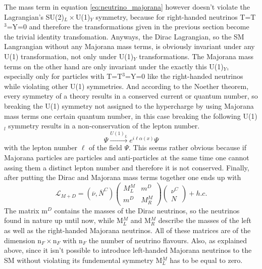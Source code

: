 The mass term in equation \ref{eq:neutrino_majorana} however doesn't violate the Lagrangian's SU(2)$_L\times$U(1)$_Y$ symmetry, because for right-handed neutrinos T=T$^3$=Y=0 and therefore the transformations given in the previous section become the trivial identity transfomation. Anyways, the Dirac Lagrangian, so the SM Langrangian without any Majorana mass terms, is obviously invariant under any U(1) transformation, not only under U(1)$_Y$ transformations. The Majorana mass terms on the other hand are only invariant under the exactly this U(1)$_Y$, especially only for particles with T=T$^3$=Y=0 like the right-handed neutrinos while violating other U(1) symmetries. And according to the Noether theorem, every symmetry of a theory results in a conserved current or quantum number, so breaking the U(1) symmetry not assigned to the hypercharge by using Majorana mass terms one certain quantum number, in this case breaking the following U(1)$_l$ symmetry results in a non-conservation of the lepton number.
\begin{equation}
	\Psi\overset{U(1)_L}{\longrightarrow}e^{i\ell\alpha(x)}\Psi
\end{equation}
with the lepton number $\ell$ of the field $\Psi$.
This seems rather obvious because if Majorana particles are particles and anti-particles at the same time one cannot assing them a distinct lepton number and therefore it is not conserved. \newline
Finally, after putting the Dirac and Majorana mass terms together one ends up with
\begin{equation}
	\mathcal{L}_{M+D}=\left(\overline{\nu},\overline{N}^C\right)	\left(\begin{array}{cc}M^M_L&m^D\\m^D&M^M_R\end{array}\right)	\left(\begin{array}{c}\nu^C\\N\end{array}\right)+h.c.
	\label{eq_majorana_dirac}
\end{equation}
The matrix m$^D$ contains the masses of the Dirac neutrinos, so the neutrinos found in nature up until now, while M$^M_L$ and M$^M_R$ describe the masses of the left as well as the right-handed Majorana neutrinos. All of these matrices are of the dimension n$_F\times$n$_F$ with n$_F$ the number of neutrino flavours. Also, as explained above, since it isn't possible to introduce left-handed Majorana neutrinos to the SM without violating its fundemental symmetry M$^M_L$ has to be equal to zero.
